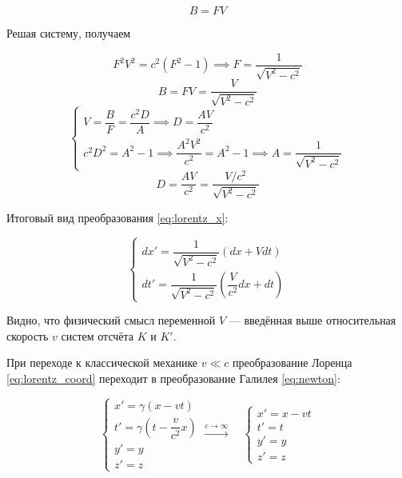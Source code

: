 \documentclass{article}
\begin{document}
\begin{equation*}
    B=FV
\end{equation*}

Решая систему, получаем

\begin{equation*}
    F^2V^2=c^2\left(F^2-1\right) \implies F=\frac{1}{\sqrt{V^2-c^2}}
\end{equation*}
\begin{equation*}
    B=FV=\frac{V}{\sqrt{V^2-c^2}}
\end{equation*}
\begin{equation*}
    \begin{cases}
    V=\dfrac{B}{F}=\dfrac{c^2D}{A} \implies D=\dfrac{AV}{c^2}\\
    c^2D^2=A^2-1 \implies \dfrac{A^2V^2}{c^2}=A^2-1 \implies A=\dfrac{1}{\sqrt{V^2-c^2}}
    \end{cases}
\end{equation*}
\begin{equation*}
    D=\frac{AV}{c^2}=\frac{V/c^2}{\sqrt{V^2-c^2}}
\end{equation*}

Итоговый вид преобразования \eqref{eq:lorentz_x}:

\begin{equation*}
    \begin{cases}
    dx'=\dfrac{1}{\sqrt{V^2-c^2}}\left(dx+Vdt\right)\\
    dt'=\dfrac{1}{\sqrt{V^2-c^2}}\left(\dfrac{V}{c^2}dx+dt\right)
    \end{cases}
\end{equation*}

Видно, что физический смысл переменной $V$ --- введённая выше относительная скорость $v$ систем отсчёта $K$ и $K'$.

При переходе к классической механике $v\ll c$ преобразование Лоренца \eqref{eq:lorentz_coord} переходит в преобразование Галилея \eqref{eq:newton}:

\begin{equation*}
    \begin{cases}
    x'=\gamma\left(x-vt\right)\\
    t'=\gamma\left(t-\dfrac{v}{c^2}x\right)\\
    y'=y\\
    z'=z
    \end{cases}
    \xrightarrow{c\to\infty}\quad
    \begin{cases}
    x'=x-vt\\
    t'=t\\
    y'=y\\
    z'=z
    \end{cases}
\end{equation*}
\end{document}
